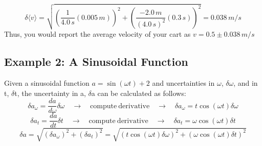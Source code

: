 \[ \delta \langle v \rangle = \sqrt{ \left( \frac{1}{4.0 \, s} (0.005 \, m) \right)^{2} + \left( \frac{-2.0 \, m}{(4.0 \, s)^{2}} (0.3 \, s) \right)^{2}} = 0.038 \, m/s \]
Thus, you would report the average velocity of your cart as $v = 0.5 \pm 0.038 \, m/s$

\subsection*{Example 2: A Sinusoidal Function}
Given a sinusoidal function $a = \sin(\omega t) + 2$ and uncertainties in $\omega$, $\delta \omega$, and in t, $\delta$t, the uncertainty in a, $\delta$a can be calculated as follows:
 \[ \delta a_{\omega} = \frac{da}{d \omega} \delta \omega
   \quad \rightarrow \quad \mathrm{compute \ derivative} \quad \rightarrow \quad
   \delta a_{\omega} = t \cos(\omega t) \delta \omega \]
%
\[ \delta a_{t} = \frac{da}{dt} \delta t
   \quad \rightarrow \quad \mathrm{compute \ derivative} \quad \rightarrow \quad
   \delta a_{t} = \omega \cos(\omega t) \delta t \]
%
\[ \delta a = \sqrt{(\delta a_{\omega})^{2} + (\delta a_{t})^{2}} 
   = \sqrt{\left( t \cos(\omega t) \delta \omega \right)^{2} + \left( \omega \cos(\omega t) \delta t \right)^{2}} \]
   
